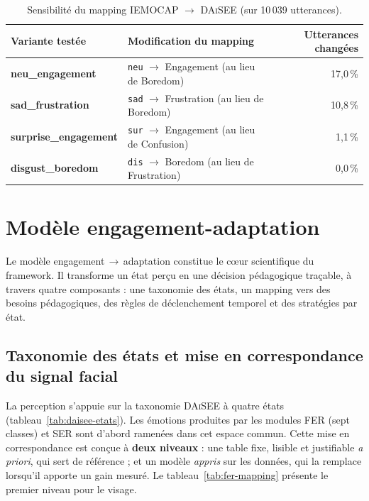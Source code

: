 \begin{table}[H]
\centering
\renewcommand{\arraystretch}{1.2}
\begin{tabular}{>{\bfseries}l p{7.2cm} r}
\toprule
Variante testée & Modification du mapping & Utterances changées \\
\midrule
neu\_engagement &
\texttt{neu} $\rightarrow$ Engagement (au lieu de Boredom) & 17,0\,\% \\
sad\_frustration &
\texttt{sad} $\rightarrow$ Frustration (au lieu de Boredom) & 10,8\,\% \\
surprise\_engagement &
\texttt{sur} $\rightarrow$ Engagement (au lieu de Confusion) & 1,1\,\% \\
disgust\_boredom &
\texttt{dis} $\rightarrow$ Boredom (au lieu de Frustration) & 0,0\,\% \\
\bottomrule
\end{tabular}
\caption{Sensibilité du mapping \textsc{IEMOCAP} $\rightarrow$ \textsc{DAiSEE}
(sur 10\,039 utterances).}
\label{tab:sensibilite-mapping}
\end{table}

\section{Modèle engagement-adaptation}
\label{sec:modele}

Le modèle engagement\,$\rightarrow$\,adaptation constitue le c\oe ur scientifique
du framework. Il transforme un état perçu en une décision pédagogique traçable, à
travers quatre composants : une taxonomie des états, un mapping vers des besoins
pédagogiques, des règles de déclenchement temporel et des stratégies par état.

\subsection{Taxonomie des états et mise en correspondance du signal facial}

La perception s'appuie sur la taxonomie \textsc{DAiSEE} à quatre états
(tableau~\ref{tab:daisee-etats}). Les émotions produites par les modules FER
(sept classes) et SER sont d'abord ramenées dans cet espace commun. Cette mise en
correspondance est conçue à \textbf{deux niveaux} : une table fixe, lisible et
justifiable \emph{a priori}, qui sert de référence ; et un modèle \emph{appris}
sur les données, qui la remplace lorsqu'il apporte un gain mesuré. Le
tableau~\ref{tab:fer-mapping} présente le premier niveau pour le visage.

